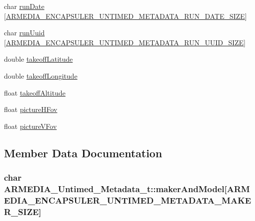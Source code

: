 \begin{DoxyCompactItemize}
char \hyperlink{struct_a_r_m_e_d_i_a___untimed___metadata__t_a7a8944f36df0837b812a5df84836a732}{run\+Date} \mbox{[}\hyperlink{_a_r_m_e_d_i_a___video_encapsuler_8h_afc3389b360505d47088f8eef086e0861}{A\+R\+M\+E\+D\+I\+A\+\_\+\+E\+N\+C\+A\+P\+S\+U\+L\+E\+R\+\_\+\+U\+N\+T\+I\+M\+E\+D\+\_\+\+M\+E\+T\+A\+D\+A\+T\+A\+\_\+\+R\+U\+N\+\_\+\+D\+A\+T\+E\+\_\+\+S\+I\+ZE}\mbox{]}
\item 
char \hyperlink{struct_a_r_m_e_d_i_a___untimed___metadata__t_af27fd1845cde5f2e86682486eeb9c410}{run\+Uuid} \mbox{[}\hyperlink{_a_r_m_e_d_i_a___video_encapsuler_8h_a870f21f2dab14aafcfe652112d53369d}{A\+R\+M\+E\+D\+I\+A\+\_\+\+E\+N\+C\+A\+P\+S\+U\+L\+E\+R\+\_\+\+U\+N\+T\+I\+M\+E\+D\+\_\+\+M\+E\+T\+A\+D\+A\+T\+A\+\_\+\+R\+U\+N\+\_\+\+U\+U\+I\+D\+\_\+\+S\+I\+ZE}\mbox{]}
\item 
double \hyperlink{struct_a_r_m_e_d_i_a___untimed___metadata__t_a26ddda12ca90ef44e898fc4068d86658}{takeoff\+Latitude}
\item 
double \hyperlink{struct_a_r_m_e_d_i_a___untimed___metadata__t_ad0441afac05d28c6f952274a6faeba06}{takeoff\+Longitude}
\item 
float \hyperlink{struct_a_r_m_e_d_i_a___untimed___metadata__t_a0100833756ed545568f961156bdb3329}{takeoff\+Altitude}
\item 
float \hyperlink{struct_a_r_m_e_d_i_a___untimed___metadata__t_af6b96beb1dbcf559fbc4ff2dfbf312ae}{picture\+H\+Fov}
\item 
float \hyperlink{struct_a_r_m_e_d_i_a___untimed___metadata__t_a98080ac65d8f2632f58590b20aade598}{picture\+V\+Fov}
\end{DoxyCompactItemize}


\subsection{Member Data Documentation}
\subsubsection[{\texorpdfstring{maker\+And\+Model}{makerAndModel}}]{\setlength{\rightskip}{0pt plus 5cm}char A\+R\+M\+E\+D\+I\+A\+\_\+\+Untimed\+\_\+\+Metadata\+\_\+t\+::maker\+And\+Model\mbox{[}{\bf A\+R\+M\+E\+D\+I\+A\+\_\+\+E\+N\+C\+A\+P\+S\+U\+L\+E\+R\+\_\+\+U\+N\+T\+I\+M\+E\+D\+\_\+\+M\+E\+T\+A\+D\+A\+T\+A\+\_\+\+M\+A\+K\+E\+R\+\_\+\+S\+I\+ZE}\mbox{]}}\hypertarget{struct_a_r_m_e_d_i_a___untimed___metadata__t_a47fee96f3ef6834b4434e20e5e2a9036}{}\label{struct_a_r_m_e_d_i_a___untimed___metadata__t_a47fee96f3ef6834b4434e20e5e2a9036}
